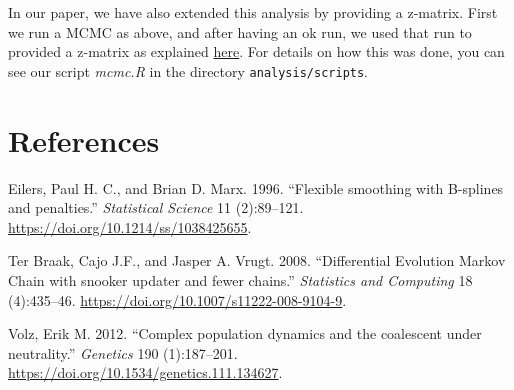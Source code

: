 \documentclass[12pt,]{article}
\begin{document}
In our paper, we have also extended this analysis by providing a
z-matrix. First we run a MCMC as above, and after having an ok run, we
used that run to provided a z-matrix as explained
\href{\%22https://github.com/florianhartig/BayesianTools/issues/79\%22}{here}.
For details on how this was done, you can see our script \emph{mcmc.R}
in the directory \texttt{analysis/scripts}.

\hypertarget{references}{%
\section*{References}\label{references}}

\hypertarget{refs}{}
\leavevmode\hypertarget{ref-Eilers1996}{}%
Eilers, Paul H. C., and Brian D. Marx. 1996. ``Flexible smoothing with
B-splines and penalties.'' \emph{Statistical Science} 11 (2):89--121.
\url{https://doi.org/10.1214/ss/1038425655}.

\leavevmode\hypertarget{ref-TerBraak2008}{}%
Ter Braak, Cajo J.F., and Jasper A. Vrugt. 2008. ``Differential
Evolution Markov Chain with snooker updater and fewer chains.''
\emph{Statistics and Computing} 18 (4):435--46.
\url{https://doi.org/10.1007/s11222-008-9104-9}.

\leavevmode\hypertarget{ref-Volz2012}{}%
Volz, Erik M. 2012. ``Complex population dynamics and the coalescent
under neutrality.'' \emph{Genetics} 190 (1):187--201.
\url{https://doi.org/10.1534/genetics.111.134627}.
\end{document}
